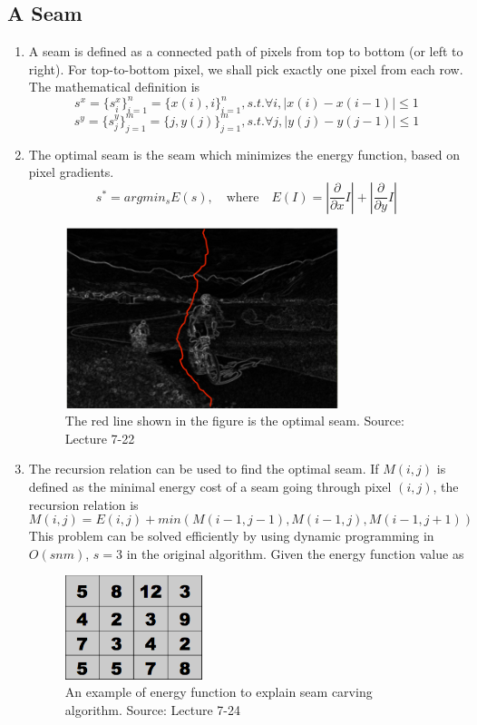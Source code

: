 \documentclass{article}
\begin{document}
\subsection{A Seam}
\begin{enumerate}
\item A seam is defined as a connected path of pixels from top to bottom (or left to right). For top-to-bottom pixel, we shall pick exactly one pixel from each row. The mathematical definition is
$$
s^x = \{s_i^x\}_{i=1}^n = \{x(i),i\}_{i=1}^n, s.t. \forall i, |x(i) - x(i - 1)| \leq 1
$$
$$
s^y = \{s_j^y\}_{j=1}^m = \{j,y(j)\}_{j=1}^m, s.t. \forall j, |y(j) - y(j - 1)| \leq 1
$$
\item The optimal seam is the seam which minimizes the energy function, based on pixel gradients.
$$
s^{*} = argmin_s E(s), \quad \textrm{where} \quad E(I) = |\frac{\partial}{\partial x}I| + |\frac{\partial}{\partial y}I|
$$
\begin{figure}[H]
\centering
\includegraphics[width=8cm]{Optimal_Seam.png}
\caption{The red line shown in the figure is the optimal seam. Source: Lecture 7-22}
\end{figure}
\item The recursion relation can be used to find the optimal seam. If $M(i,j)$ is defined as the minimal energy cost of a seam going through pixel $(i,j)$, the recursion relation is
$$
M(i,j) = E(i,j) + min(M(i-1,j-1), M(i-1,j), M(i-1,j+1))
$$
This problem can be solved efficiently by using dynamic programming in $O(snm)$, $s=3$ in the original algorithm.
Given the energy function value as
\begin{figure}[H]
\centering
\includegraphics[width=4cm]{energy.png}
\caption{An example of energy function to explain seam carving algorithm. Source: Lecture 7-24}

\end{figure}
\end{enumerate}
\end{document}
